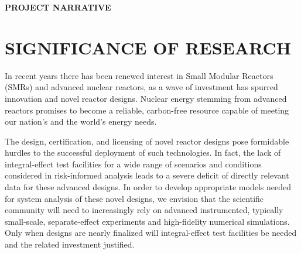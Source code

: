 \documentclass[11pt,letterpaper,english]{article}
\begin{document}
\setlength{\parindent}{0in} %



\pagestyle{fancy}   \renewcommand{%
\headrulewidth}{0.0pt}

\begin{center}
{\bf PROJECT NARRATIVE} %
\end{center}

\vspace{-.15in}






\vspace{-.25in}
\section{SIGNIFICANCE OF RESEARCH}
\vspace{-.2in}

In recent years there has been renewed interest in Small Modular Reactors (SMRs) and advanced nuclear reactors, as a wave of investment has spurred innovation and novel reactor designs. Nuclear energy stemming from advanced reactors promises to become a reliable, carbon-free resource capable of meeting our nation's and the world's energy needs.

The design, certification, and licensing of novel reactor designs pose formidable hurdles to the successful deployment of such technologies. In fact, the lack of integral-effect test facilities for a wide range of scenarios and conditions considered in risk-informed analysis leads to a severe deficit of directly relevant data for these advanced designs. In order to develop appropriate models needed for system analysis of these novel designs, we envision that the scientific community will need to increasingly rely on advanced instrumented, typically small-scale, separate-effect experiments and high-fidelity numerical simulations. Only when designs are nearly finalized will integral-effect test facilities be needed and the related investment justified.
\end{document}
